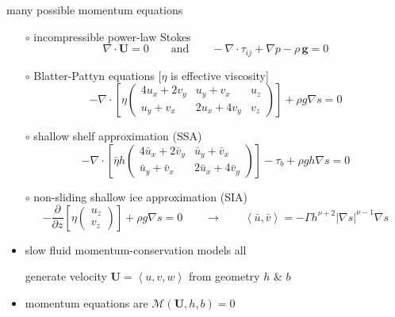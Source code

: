 \documentclass[xcolor={dvipsnames}]{beamer}
\newcommand\bU{\mathbf{U}}
\newcommand\Div{\nabla\cdot}
\newcommand\grad{\nabla}
\newcommand{\ip}[2]{\ensuremath{\left<#1,#2\right>}}
\begin{document}
\begin{frame}{many possible momentum equations}

  \begin{itemize}
  \scriptsize
  \item[$\circ$] incompressible power-law Stokes
\begin{equation*}
  \nabla \cdot \bU = 0 \qquad \text{and} \qquad - \nabla \cdot \tau_{ij} + \nabla p - \rho\, \mathbf{g} = 0
\end{equation*}
  \item[$\circ$] Blatter-Pattyn equations [$\eta$ is effective viscosity]
$$-\Div \left[\eta \begin{pmatrix}
4 u_x+2v_y & u_y+v_x   & u_z \\
u_y+v_x    & 2u_x+4v_y & v_z
\end{pmatrix} \right] + \rho g \grad s = 0$$
  \item[$\circ$] shallow shelf approximation (SSA)
$$-\Div \left[\bar \eta h \begin{pmatrix}
4 \bar u_x+2\bar v_y & \bar u_y+\bar v_x   \\
\bar u_y+\bar v_x    & 2\bar u_x+4\bar v_y
\end{pmatrix} \right] - \tau_b + \rho g h \grad s = 0$$
  \item[$\circ$] non-sliding shallow ice approximation (SIA)
$$-\frac{\partial}{\partial z} \left[\eta \begin{pmatrix}
u_z \\
v_z
\end{pmatrix} \right] + \rho g \grad s = 0
\qquad \to \qquad
\ip{\bar u}{\bar v} = -\Gamma h^{\nu+2} |\grad s|^{\nu-1} \grad s$$
  \end{itemize}

\begin{itemize}
\item slow fluid momentum-conservation models all
\begin{center}
\alert{generate velocity $\bU=\left<u,v,w\right>$ from geometry $h$ \& $b$}
\end{center}
\item momentum equations are $\mathcal{M}(\bU,h,b)=0$
\end{itemize}
\end{frame}
\end{document}
